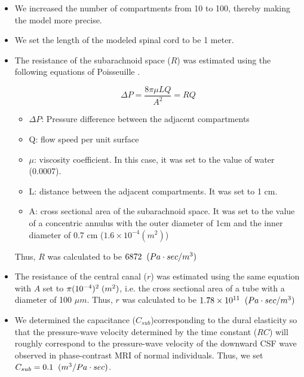 \documentclass[fleqn,10pt]{wlscirep}
\begin{document}
\begin{itemize}
    \item We increased the number of compartments from 10 to 100,
        thereby making the model more precise.
    \item We set the length of the modeled spinal cord to be 1 meter.
    \item The resistance of the subarachnoid space ($R$) was estimated
        using the following equations of Poisseuille
        \cite{brook1999numerical, sherwin2003computational,
        huilgol2020fast}. 

             $$\Delta P=\frac{8\pi \mu{}LQ}{A^{2}}=RQ$$

        \begin{itemize}
            \item $\Delta P$: Pressure difference between the adjacent compartments
            \item Q: flow speed per unit surface
            \item $\mu$: viscosity coefficient. In this case, it was set to the value of water (0.0007).
            \item L: distance between the adjacent compartments. It was set to 1 cm.
            \item A: cross sectional area of the subarachnoid
                    space. It was set to the value of a concentric
                    annulus \cite{huilgol2020fast} with the outer diameter of 1cm and the inner diameter of 0.7 cm ($1.6\times{}10^{-4} (m^2)$) 
        \end{itemize}
    Thus, $R$ was calculated to be $6872\hspace{0.2cm}(Pa\cdot{}sec/m^3)$
    \item The resistance of the central canal ($r$) was estimated
            using the same equation with $A$ set to
            $\pi{}(10^{-4})^2\hspace{0.1cm}(m^2)$, i.e. the cross
            sectional area of a tube with a diameter of 100 $\mu{}m$.
            Thus, $r$ was calculated to be $1.78\times10^{11}\hspace{0.2cm}(Pa\cdot{}sec/m^3)$
    \item We determined the capacitance ($C_{sub}$)corresponding to the dural elasticity so that the pressure-wave velocity determined by the time constant ($RC$) will roughly correspond to the pressure-wave velocity of the downward CSF wave observed in phase-contrast MRI of normal individuals. Thus, we set $C_{sub}=0.1\hspace{0.2cm}(m^3/Pa\cdot{}sec)$.
\end{itemize}
\end{document}
